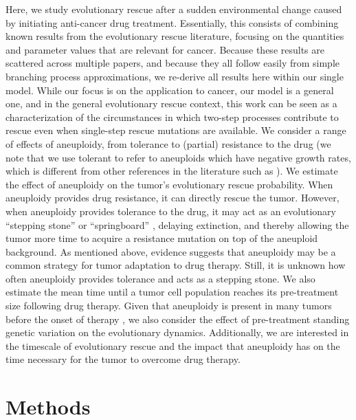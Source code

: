 \documentclass[12pt]{extarticle}
\begin{document}
Here, we study evolutionary rescue after a sudden environmental change caused by initiating anti-cancer drug treatment. 
Essentially, this consists of combining known results from the evolutionary rescue literature, focusing on the quantities and parameter values that are relevant for cancer.
Because these results are scattered across multiple papers, and because they all follow easily from simple branching process approximations, we re-derive all results here within our single model.
While our focus is on the application to cancer, our model is a general one, and in the general evolutionary rescue context, this work can be seen as a characterization of the circumstances in which two-step processes contribute to rescue even when single-step rescue mutations are available.
We consider a range of effects of aneuploidy, from tolerance to (partial) resistance to the drug \citep{brauner2016distinguishing} (we note that we use tolerant to refer to aneuploids which have negative growth rates, which is different from other references in the literature such as \citet{berman2020drug}). %
We estimate the effect of aneuploidy on the tumor's evolutionary rescue probability. When aneuploidy provides drug resistance, it can directly rescue the tumor. However, when aneuploidy provides tolerance to the drug, it may act as an evolutionary ``stepping stone'' or ``springboard'' \citep{Yona2015,martin2013probability,osmond_genetic_2020}, delaying extinction, and thereby allowing the tumor more time to acquire a resistance mutation on top of the aneuploid background. 
As mentioned above, evidence suggests that aneuploidy may be a common strategy for tumor adaptation to drug therapy. Still, it is unknown how often aneuploidy provides tolerance and acts as a stepping stone.
We also estimate the mean time until a tumor cell population reaches its pre-treatment size following drug therapy. 
Given that aneuploidy is present in many tumors before the onset of therapy \citep{lukow2021chromosomal,ben2020context}, we also consider the effect of pre-treatment standing genetic variation on the evolutionary dynamics. Additionally, we are interested in the timescale of evolutionary rescue and the impact that aneuploidy has on the time necessary for the tumor to overcome drug therapy. 

\section*{Methods}
\end{document}
